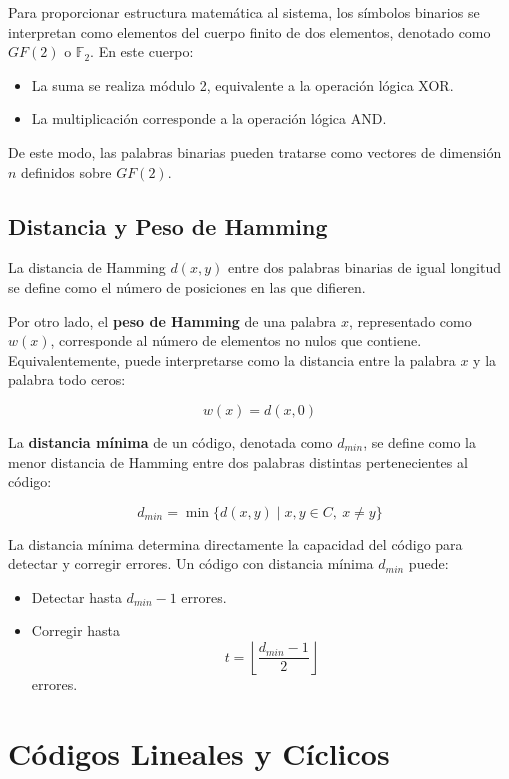Para proporcionar estructura matemática al sistema, los símbolos binarios se interpretan como elementos del cuerpo finito de dos elementos, denotado como $GF(2)$ o $\mathbb{F}_2$. En este cuerpo:

\begin{itemize}
    \item La suma se realiza módulo 2, equivalente a la operación lógica XOR.
    \item La multiplicación corresponde a la operación lógica AND.
\end{itemize}

De este modo, las palabras binarias pueden tratarse como vectores de dimensión $n$ definidos sobre $GF(2)$.


\subsection{Distancia y Peso de Hamming}

La distancia de Hamming $d(x,y)$ entre dos palabras binarias de igual longitud se define como el número de posiciones en las que difieren.

Por otro lado, el \textbf{peso de Hamming} de una palabra $x$, representado como $w(x)$, corresponde al número de elementos no nulos que contiene. Equivalentemente, puede interpretarse como la distancia entre la palabra $x$ y la palabra todo ceros:

$$
w(x) = d(x,0)
$$

La \textbf{distancia mínima} de un código, denotada como $d_{min}$, se define como la menor distancia de Hamming entre dos palabras distintas pertenecientes al código:

$$
d_{min} = \min \{ d(x,y) \mid x,y \in C,\ x \neq y \}
$$

La distancia mínima determina directamente la capacidad del código para detectar y corregir errores. Un código con distancia mínima $d_{min}$ puede:

\begin{itemize}
    \item Detectar hasta $d_{min}-1$ errores.
    \item Corregir hasta
    $$
    t = \left\lfloor \frac{d_{min}-1}{2} \right\rfloor
    $$
    errores.
\end{itemize}


\section{Códigos Lineales y Cíclicos}
\label{sec:codigos_ciclicos}


